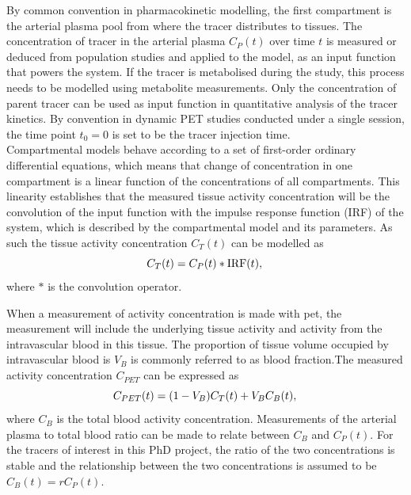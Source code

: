 By common convention in pharmacokinetic modelling, the first compartment is the arterial plasma pool from where the tracer distributes to tissues. The concentration of tracer in the arterial plasma $C_P(t)$ over time $t$ is measured or deduced from population studies and applied to the model, as an input function that powers the system.
If the tracer is metabolised during the study, this process needs to be modelled using metabolite measurements. Only the concentration of parent tracer can be used as input function in quantitative analysis of the tracer kinetics.
By convention in dynamic PET studies conducted under a single session, the time point $t_0=0$ is set to be the tracer injection time. \\
Compartmental models behave according to a set of first-order ordinary differential equations, which means that change of concentration in one compartment is a linear function of the concentrations of all compartments. This linearity establishes that the measured tissue activity concentration will be the convolution of the input function with the impulse response function (IRF) of the system, which is described by the compartmental model and its parameters.
As such the tissue activity concentration $C_T(t)$ can be modelled as
\begin{equation}
 C_T(t) = C_P(t) \ast \textrm{IRF}(t)  \\ , \\ 
\end{equation}
where $\ast$ is the convolution operator. 

When a measurement of activity concentration is made with \gls{pet}, the measurement will include the underlying tissue activity and activity from the intravascular blood in this tissue. The proportion of tissue volume occupied by intravascular blood is $V_B$ is commonly referred to as blood fraction.The measured activity concentration $C_{PET}$ can be expressed as
\begin{equation}
{C_{PET}}(t)  = (1-V_{B}){C_{T}}(t) + V_{B}C_{B}(t) \\ , \\
\label{eqn:CPET}
\end{equation}
where $C_{B}$ is the total blood activity concentration.
Measurements of the %
arterial plasma to total blood ratio can be made to relate between $C_{B}$ and $C_P(t)$. 
For the tracers of interest in this PhD project, the ratio of the two concentrations is stable and the relationship between the two concentrations is assumed to be $C_{B}(t) = r C_{P}(t)$. 

